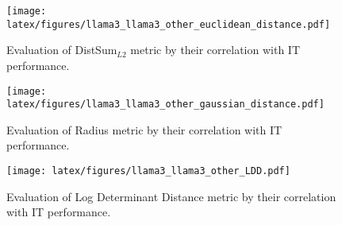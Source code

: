 \begin{figure}[t!]
    \centering
        \texttt{[image: latex/figures/llama3\_llama3\_other\_euclidean\_distance.pdf]}
    \caption{Evaluation of DistSum$_{L2}$ metric by their correlation with IT performance.}
    \label{fig:scatter_l2_appdenix}
    \vspace{-4mm}
\end{figure}
\begin{figure}[t!]
    \centering
        \texttt{[image: latex/figures/llama3\_llama3\_other\_gaussian\_distance.pdf]}
    \caption{Evaluation of Radius metric by their correlation with IT performance.}
    \label{fig:scatter_radius_appdenix}
    \vspace{-4mm}
\end{figure}
\begin{figure}[t!]
    \centering
        \texttt{[image: latex/figures/llama3\_llama3\_other\_LDD.pdf]}
    \caption{Evaluation of Log Determinant Distance metric by their correlation with IT performance.}
    \label{fig:scatter_ldd_appdenix}
    \vspace{-4mm}
\end{figure}



